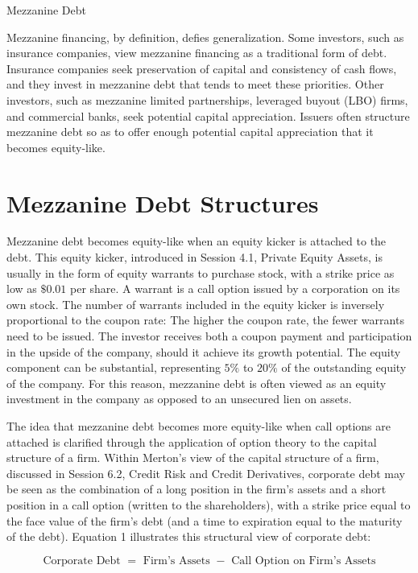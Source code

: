 \documentclass[11pt]{article}
\begin{document}
Mezzanine Debt

Mezzanine financing, by definition, defies generalization. Some investors, such as insurance companies, view mezzanine financing as a traditional form of debt. Insurance companies seek preservation of capital and consistency of cash flows, and they invest in mezzanine debt that tends to meet these priorities. Other investors, such as mezzanine limited partnerships, leveraged buyout (LBO) firms, and commercial banks, seek potential capital appreciation. Issuers often structure mezzanine debt so as to offer enough potential capital appreciation that it becomes equity-like.

\section*{Mezzanine Debt Structures}
Mezzanine debt becomes equity-like when an equity kicker is attached to the debt. This equity kicker, introduced in Session 4.1, Private Equity Assets, is usually in the form of equity warrants to purchase stock, with a strike price as low as $\$ 0.01$ per share. A warrant is a call option issued by a corporation on its own stock. The number of warrants included in the equity kicker is inversely proportional to the coupon rate: The higher the coupon rate, the fewer warrants need to be issued. The investor receives both a coupon payment and participation in the upside of the company, should it achieve its growth potential. The equity component can be substantial, representing $5 \%$ to $20 \%$ of the outstanding equity of the company. For this reason, mezzanine debt is often viewed as an equity investment in the company as opposed to an unsecured lien on assets.

The idea that mezzanine debt becomes more equity-like when call options are attached is clarified through the application of option theory to the capital structure of a firm. Within Merton's view of the capital structure of a firm, discussed in Session 6.2, Credit Risk and Credit Derivatives, corporate debt may be seen as the combination of a long position in the firm's assets and a short position in a call option (written to the shareholders), with a strike price equal to the face value of the firm's debt (and a time to expiration equal to the maturity of the debt). Equation 1 illustrates this structural view of corporate debt:


\begin{equation*}
\text { Corporate Debt }=\text { Firm's Assets }- \text { Call Option on Firm's Assets } \tag{1}
\end{equation*}
\end{document}
